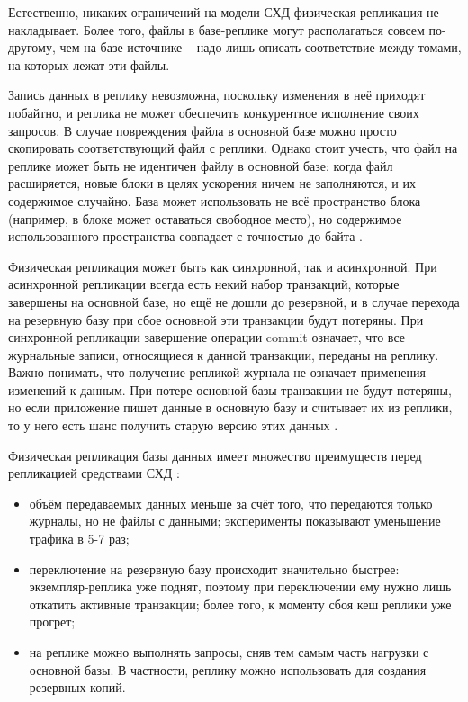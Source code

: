 Естественно, никаких ограничений на модели СХД физическая репликация не накладывает. Более того, файлы в базе-реплике
могут располагаться совсем по-другому, чем на базе-источнике – надо лишь описать соответствие между томами, на которых
лежат эти файлы.

Запись данных в реплику невозможна, поскольку изменения в неё приходят побайтно, и реплика не может обеспечить
конкурентное исполнение своих запросов. В случае повреждения файла в основной базе можно просто скопировать
соответствующий файл с реплики. Однако стоит учесть, что файл на реплике может быть не идентичен файлу в основной базе:
когда файл расширяется, новые блоки в целях ускорения ничем не заполняются, и их содержимое случайно. База может
использовать не всё пространство блока (например, в блоке может оставаться свободное место), но содержимое
использованного пространства совпадает с точностью до байта \autocite{PhysLogPeplic}.

Физическая репликация может быть как синхронной, так и асинхронной. При асинхронной репликации всегда есть некий набор
транзакций, которые завершены на основной базе, но ещё не дошли до резервной, и в случае перехода на резервную базу при
сбое основной эти транзакции будут потеряны. При синхронной репликации завершение операции commit означает, что все
журнальные записи, относящиеся к данной транзакции, переданы на реплику. Важно понимать, что получение репликой журнала
не означает применения изменений к данным. При потере основной базы транзакции не будут потеряны, но если приложение
пишет данные в основную базу и считывает их из реплики, то у него есть шанс получить старую версию этих данных \autocite{PhysLogPeplic}.

Физическая репликация базы данных имеет множество преимуществ перед репликацией средствами СХД \autocite{PhysLogPeplic}:
\begin{itemize}
    \item объём передаваемых данных меньше за счёт того, что передаются только журналы, но не файлы с данными; эксперименты показывают уменьшение трафика в 5-7 раз;
    \item переключение на резервную базу происходит значительно быстрее: экземпляр-реплика уже поднят, поэтому при переключении ему нужно лишь откатить активные транзакции; более того, к моменту сбоя кеш реплики уже прогрет;
    \item на реплике можно выполнять запросы, сняв тем самым часть нагрузки с основной базы. В частности, реплику можно использовать для создания резервных копий.
\end{itemize}

